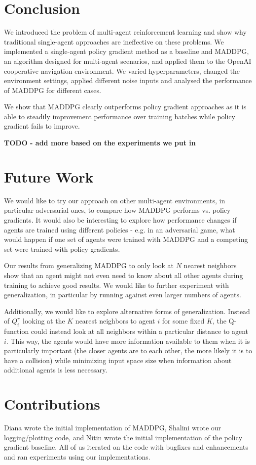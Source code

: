 \documentclass{article}
\begin{document}
\section{Conclusion}

We introduced the problem of multi-agent reinforcement learning and show why traditional single-agent approaches are ineffective on these problems. We implemented a single-agent policy gradient method as a baseline and MADDPG, an algorithm designed for multi-agent scenarios, and applied them to the OpenAI cooperative navigation environment. We varied hyperparameters, changed the environment settings, applied different noise inputs and analysed the performance of MADDPG for different cases. 

We show that MADDPG clearly outperforms policy gradient approaches as it is able to steadily improvement performance over training batches while policy gradient fails to improve. 

\textbf{TODO - add more based on the experiments we put in} 


\section{Future Work}
We would like to try our approach on other multi-agent environments, in particular adversarial ones, to compare how MADDPG performs vs. policy gradients. It would also be interesting to explore how performance changes if agents are trained using different policies - e.g. in an adversarial game, what would happen if one set of agents were trained with MADDPG and a competing set were trained with policy gradients.

Our results from generalizing MADDPG to only look at $N$ nearest neighbors show that an agent might not even need to know about all other agents during training to achieve good results. We would like to further experiment with generalization, in particular by running against even larger numbers of agents.

Additionally, we would like to explore alternative forms of generalization. Instead of $Q^\pi_i$ looking at the $K$ nearest neighbors to agent $i$ for some fixed $K$, the Q-function could instead look at all neighbors within a particular distance to agent $i$. This way, the agents would have more information available to them when it is particularly important (the closer agents are to each other, the more likely it is to have a collision) while minimizing input space size when information about additional agents is less necessary.

\section*{Contributions}
Diana wrote the initial implementation of MADDPG, Shalini wrote our logging/plotting code, and Nitin wrote the initial implementation of the policy gradient baseline. All of us iterated on the code with bugfixes and enhancements and ran experiments using our implementations.



\end{document}
